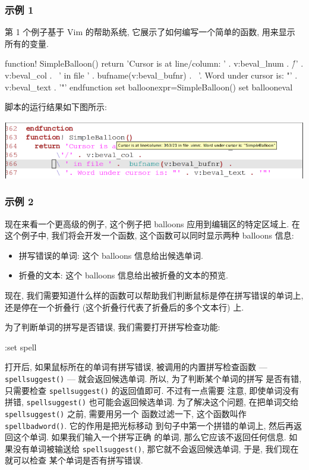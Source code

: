\begin{warning}
\subsubsection{示例 1}
\label{subsubsec:example_1}

第 1 个例子基于 Vim 的帮助系统, 它展示了如何编写一个简单的函数, 用来显示
所有的变量.
\begin{vimscript}
function! SimpleBalloon()
   return 'Cursor is at line/column: ' . v:beval_lnum .
		\'/' . v:beval_col .
		\ ' in file ' .  bufname(v:beval_bufnr) .
		\ '. Word under cursor is: "' . v:beval_text . '"'
endfunction
set balloonexpr=SimpleBalloon()
set ballooneval
\end{vimscript}
脚本的运行结果如下图所示:
\begin{center}
    \includegraphics[scale=0.5]{./images/page44.png}
\end{center}

\subsubsection{示例 2}
\label{subsubsec:example_2}

现在来看一个更高级的例子, 这个例子把 balloons 应用到编辑区的特定区域上.
在这个例子中, 我们将会开发一个函数, 这个函数可以同时显示两种 balloons 
信息:
\begin{itemize}
    \item 拼写错误的单词: 这个 balloons 信息给出候选单词.
    \item 折叠的文本: 这个 balloons 信息给出被折叠的文本的预览.
\end{itemize}

现在, 我们需要知道什么样的函数可以帮助我们判断鼠标是停在拼写错误的单词上,
还是停在一个折叠行 (这个折叠行代表了折叠后的多个文本行) 上.

为了判断单词的拼写是否错误, 我们需要打开拼写检查功能:
\begin{vimcmd}
:set spell
\end{vimcmd}
打开后, 如果鼠标所在的单词有拼写错误, 被调用的内置拼写检查函数 ---
\texttt{spellsuggest()} --- 就会返回候选单词. 所以, 为了判断某个单词的拼写
是否有错, 只需要检查 \texttt{spellsuggest()} 的返回值即可. 不过有一点需要
注意, 即使单词没有拼错, \texttt{spellsuggest()} 也可能会返回候选单词.
为了解决这个问题, 在把单词交给 \texttt{spellsuggest()} 之前, 需要用另一个
函数过滤一下, 这个函数叫作 \texttt{spellbadword()}. 它的作用是把光标移动
到句子中第一个拼错的单词上, 然后再返回这个单词. 如果我们输入一个拼写正确
的单词, 那么它应该不返回任何信息. 如果没有单词被输送给
\texttt{spellsuggest()}, 那它就不会返回候选单词, 于是, 我们现在就可以检查
某个单词是否有拼写错误.


\end{warning}
